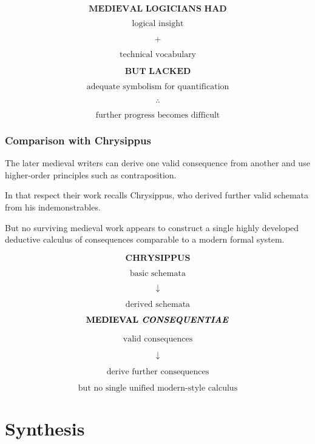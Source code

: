 \documentclass[11pt]{article}
\newcommand{\latin}[1]{\textit{#1}}
\begin{document}
\begin{whiteboard}
\[
\textbf{MEDIEVAL LOGICIANS HAD}
\]

\[
\text{logical insight}
\]

\[
+
\]

\[
\text{technical vocabulary}
\]

\[
\textbf{BUT LACKED}
\]

\[
\boxed{\text{adequate symbolism for quantification}}
\]

\[
\therefore
\]

\[
\text{further progress becomes difficult}
\]
\end{whiteboard}

\section{Comparison with Chrysippus}

The later medieval writers can derive one valid consequence from
another and use higher-order principles such as contraposition.

In that respect their work recalls Chrysippus, who derived further
valid schemata from his indemonstrables.

But no surviving medieval work appears to construct a single
highly developed deductive calculus of consequences comparable to
a modern formal system.

\begin{whiteboard}
\[
\textbf{CHRYSIPPUS}
\]

\[
\text{basic schemata}
\]

\[
\downarrow
\]

\[
\text{derived schemata}
\]

\[
\textbf{MEDIEVAL \latin{CONSEQUENTIAE}}
\]

\[
\text{valid consequences}
\]

\[
\downarrow
\]

\[
\text{derive further consequences}
\]

\[
\boxed{\text{but no single unified modern-style calculus}}
\]
\end{whiteboard}


\part{Synthesis}
\end{document}
